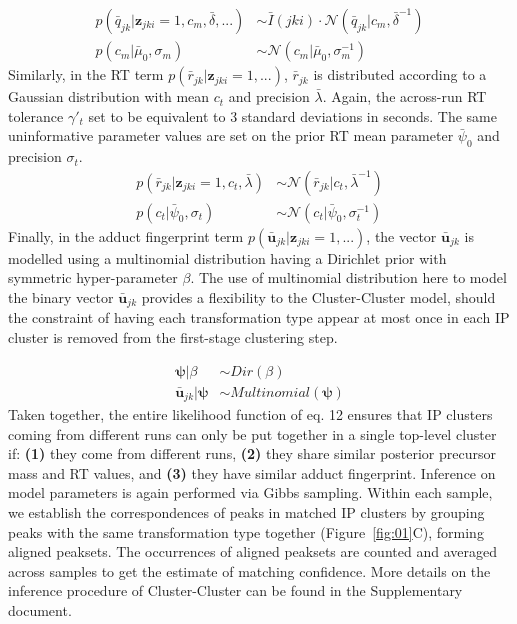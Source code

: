 \begin{align}
p({\bar{q}}_{jk}\vert\boldsymbol{z}_{jki}=1,c_m,\bar{\delta},...) &\sim \bar{I}(jki) \cdot \mathcal{N}(\bar{q}_{jk} \vert c_m,\bar{\delta}^{-1}) \\
p(c_m\vert \bar{\mu}_0,\sigma_m) &\sim \mathcal{N}(c_m \vert \bar{\mu}_0,\sigma_m^{-1})
\end{align}
Similarly, in the RT term $p({\bar{r}}_{jk}\vert\boldsymbol{z}_{jki}=1,...)$, ${\bar{r}}_{jk}$ is distributed according to a Gaussian distribution with mean $c_t$ and precision $\bar{\lambda}$. Again, the across-run RT tolerance $\gamma'_t$ set to be equivalent to 3 standard deviations in seconds. The same uninformative parameter values are set on the prior RT mean parameter $\bar{\psi}_0$ and precision $\sigma_t$.
\begin{align}
p({\bar{r}}_{jk}\vert\boldsymbol{z}_{jki}=1,c_t,\bar{\lambda}) &\sim \mathcal{N}({\bar{r}}_{jk} \vert c_t,\bar{\lambda}^{-1}) \\
p(c_t\vert \bar{\psi}_0,\sigma_t) &\sim \mathcal{N}(c_t \vert \bar{\psi}_0,\sigma_t^{-1})
\end{align}
Finally, in the adduct fingerprint term $p({\boldsymbol{\bar{u}}}_{jk}\vert\boldsymbol{z}_{jki}=1,...)$, the vector ${\boldsymbol{\bar{u}}}_{jk}$ is modelled using a multinomial distribution having a Dirichlet prior with symmetric hyper-parameter $\beta$.  The use of multinomial distribution here to model the binary vector ${\boldsymbol{\bar{u}}}_{jk}$ provides a flexibility to the Cluster-Cluster model, should the constraint of having each transformation type appear at most once in each IP cluster is removed from the first-stage clustering step.

\begin{align}
\boldsymbol{\psi}\vert\beta &\sim Dir(\beta) \\
{\boldsymbol{\bar{u}}}_{jk}\vert\boldsymbol{\psi} &\sim Multinomial(\boldsymbol{\psi})
\end{align}
Taken together, the entire likelihood function of eq. 12 ensures that IP clusters coming from different runs can only be put together in a single top-level cluster if: \textbf{(1)} they come from different runs, \textbf{(2)} they share similar posterior precursor mass and RT values, and \textbf{(3)} they have similar adduct fingerprint. Inference on model parameters is again performed via Gibbs sampling. Within each sample, we establish the correspondences of peaks in matched IP clusters by grouping peaks with the same transformation type together (Figure~\ref{fig:01}C), forming aligned peaksets. The occurrences of aligned peaksets are counted and averaged across samples to get the estimate of matching confidence. More details on the inference procedure of Cluster-Cluster can be found in the Supplementary document.

